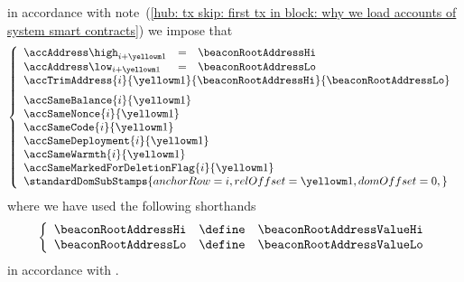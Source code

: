 \item[\underline{Loading the \inst{BEACONROOT} system smart contract:}] 
	in accordance with
	note~(\ref{hub: tx skip: first tx in block: why we load accounts of system smart contracts})
	we impose that
	\[
		\left\{ \begin{array}{lclr}
			\accAddress  \high _{i + \roffTxSkipSysiBeaconRootSystemContractAccount} & = & \beaconRootAddressHi \\
			\accAddress  \low  _{i + \roffTxSkipSysiBeaconRootSystemContractAccount} & = & \beaconRootAddressLo \\
			\multicolumn{4}{l}{
				\accTrimAddress
				{i}{\roffTxSkipSysiBeaconRootSystemContractAccount}
				{\beaconRootAddressHi}
				{\beaconRootAddressLo}} \vspace{2mm} \\
			\multicolumn{3}{l}{\accSameBalance                       {i}{\roffTxSkipSysiBeaconRootSystemContractAccount}} \\
			\multicolumn{3}{l}{\accSameNonce                         {i}{\roffTxSkipSysiBeaconRootSystemContractAccount}} \\
			\multicolumn{3}{l}{\accSameCode                          {i}{\roffTxSkipSysiBeaconRootSystemContractAccount}} \\
			\multicolumn{3}{l}{\accSameDeployment                    {i}{\roffTxSkipSysiBeaconRootSystemContractAccount}} \\
			\multicolumn{3}{l}{\accSameWarmth                        {i}{\roffTxSkipSysiBeaconRootSystemContractAccount}} \\
			\multicolumn{3}{l}{\accSameMarkedForDeletionFlag         {i}{\roffTxSkipSysiBeaconRootSystemContractAccount}} \\
			\multicolumn{3}{l}{
				\standardDomSubStamps {
					anchorRow = i                                              ,
					relOffset = \roffTxSkipSysiBeaconRootSystemContractAccount ,
					domOffset = 0                                              ,
				}
			} \\
		\end{array} \right.
	\]
	where we have used the following shorthands
	\[
		\left\{ \begin{array}{lcl}
			\beaconRootAddressHi & \define & \beaconRootAddressValueHi \\
			\beaconRootAddressLo & \define & \beaconRootAddressValueLo \\
		\end{array} \right.
	\]
	in accordance with \cite{EIP-4788}.
